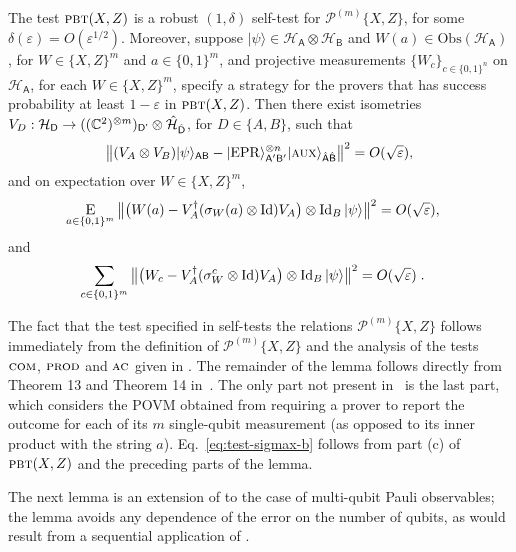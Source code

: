 \documentclass{toc}
\newcommand{\ket}[1]{|#1\rangle}
\newcommand{\Id}{\ensuremath{\mathop{\rm Id}\nolimits}}
\newcommand{\Es}[1]{\ensuremath{\mathop{\textsc{E}}}_{#1}} %
\newcommand{\setft}[1]{\mathrm{#1}}
\newcommand{\Obs}{\setft{Obs}}
\newcommand{\reg}[1]{{\textsf{#1}}}
\newcommand{\mH}{\mathcal{H}}
\newcommand{\eps}{\varepsilon}
\newcommand{\EPR}{{\rm EPR}}
\newcommand{\pbt}{\textsc{pbt}}
\newcommand{\aux}{\textsc {aux}}
\newcommand{\prodt}{\textsc{prod}}
\newcommand{\comt}{\textsc{com}}
\newcommand{\act}{\textsc{ac}}
\newcommand{\paulin}{\mathcal{P}^{(m)}\!}
\begin{document}
\begin{lemma}\label{lem:pbt}
The test $\pbt(X,Z)$ is a robust $(1,\delta)$ self-test 
for $\paulin\{X,Z\}$, for some $\delta(\eps) = O(\eps^{1/2})$. Moreover, suppose $\ket{\psi}\in\mH_\reg{A}\otimes \mH_\reg{B}$ and $W(a) \in \Obs(\mH_\reg{A})$, for $W\in \{X,Z\}^m$ and $a\in\{0,1\}^m$, and projective measurements $\{W_c\}_{c\in \{0,1\}^n}$ on $\mH_\reg{A}$, for each $W\in\{X,Z\}^m$, specify a strategy for the provers that has success probability at least $1-\eps$ in $\pbt(X,Z)$. 
Then there exist isometries $V_D:\mH_\reg{D} \to ((\C^2)^{\otimes m})_{\reg{D'}}  \otimes \hat{\mH}_{\hat{\reg{D}}}$, for $D\in\{A,B\}$, such that
$$\big\| (V_A \otimes V_B) \ket{\psi}_{\reg{AB}} - \ket{\EPR}_{\reg{A}'\reg{B}'}^{\otimes n} \ket{\aux}_{\hat{\reg{A}}\hat{\reg{B}}} \big\|^2 = O(\sqrt{\eps}),$$
and on expectation over  $W\in \{X,Z\}^m$,
\begin{align}\label{eq:test-sigmax-a}
 \Es{a\in\{0,1\}^m} \big\| \big(W(a) -V_A^\dagger (\sigma_W(a) \otimes \Id) V_A\big) \otimes \Id_B \ket{\psi} \big\|^2 &= O(\sqrt{\eps}),
\end{align}
and
\begin{align}\label{eq:test-sigmax-b}
 \sum_{c\in\{0,1\}^m} \big\| \big(W_c -V_A^\dagger (\sigma_W^c \otimes \Id) V_A\big) \otimes \Id_B \ket{\psi} \big\|^2 &= O(\sqrt{\eps})\;.
\end{align}
\end{lemma}

The fact that the test specified in  self-tests the relations $\paulin\{X,Z\}$ follows immediately from the definition of $\paulin\{X,Z\}$ and the analysis of the tests $\comt$, $\prodt$ and $\act$ given in . The remainder of the lemma follows directly from Theorem 13 and Theorem 14 in~\cite{natarajan2016robust}. The only part not present in~\cite{natarajan2016robust} is the last part, which considers the POVM obtained from requiring a prover to report the outcome for each of its $m$ single-qubit measurement (as opposed to its inner product with the string $a$). Eq.~\eqref{eq:test-sigmax-b} follows  from part (c) of $\pbt(X,Z)$ and the preceding parts of the lemma. 

The next lemma is an extension of  to the case of multi-qubit Pauli observables; the lemma avoids any dependence of the error on the number of qubits, as would result from a sequential application of .
\end{document}
